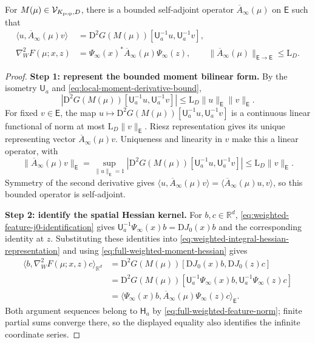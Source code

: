 \begin{lemma}
\label{lemma-structured-weighted-hessian-factorization}
For $M(\mu)\in\mathcal V_{K_{\rm pop},D}$, there is a bounded self-adjoint
operator $\overline A_\infty(\mu)$ on $\mathsf E$ such that
\begin{align}
 \langle u,\overline A_\infty(\mu)v\rangle
 &=\mathrm D^2G(M(\mu))[\mathsf U_a^{-1}u,\mathsf U_a^{-1}v],
 \label{eq:full-weighted-moment-hessian}\\
 \nabla_W^2F(\mu;x,z)
 &=\Psi_\infty(x)^*\overline A_\infty(\mu)\Psi_\infty(z),
 \qquad \|\overline A_\infty(\mu)\|_{\mathsf E\to\mathsf E}\le\mathrm L_D.
 \label{eq:full-weighted-hessian-factorization}
\end{align}
\end{lemma}
\begin{proof}
\noindent\textbf{Step 1: represent the bounded moment bilinear form.}
By the isometry $\mathsf U_a$ and \eqref{eq:local-moment-derivative-bound},
\[
 |\mathrm D^2G(M(\mu))[\mathsf U_a^{-1}u,\mathsf U_a^{-1}v]|
 \le\mathrm L_D\|u\|_{\mathsf E}\|v\|_{\mathsf E}.
\]
For fixed $v\in\mathsf E$, the map
$u\mapsto\mathrm D^2G(M(\mu))[\mathsf U_a^{-1}u,\mathsf U_a^{-1}v]$
is a continuous linear functional of norm at most
$\mathrm L_D\|v\|_{\mathsf E}$. Riesz representation gives its unique representing
vector $\overline A_\infty(\mu)v$. Uniqueness and linearity in $v$
make this a linear operator, with
\[
 \|\overline A_\infty(\mu)v\|_{\mathsf E}
 =\sup_{\|u\|_{\mathsf E}=1}
   |\mathrm D^2G(M(\mu))[\mathsf U_a^{-1}u,\mathsf U_a^{-1}v]|
 \le\mathrm L_D\|v\|_{\mathsf E}.
\]
Symmetry of the second derivative gives
$\langle u,\overline A_\infty(\mu)v\rangle
=\langle\overline A_\infty(\mu)u,v\rangle$,
so this bounded operator is self-adjoint.
\par\noindent\textbf{Step 2: identify the spatial Hessian kernel.}
For $b,c\in\mathbb R^d$, \cref{eq:weighted-feature-j0-identification}
gives $\mathsf U_a^{-1}\Psi_\infty(x)b=\mathrm D J_0(x)b$ and the
corresponding identity at $z$. Substituting these identities into
\cref{eq:weighted-integral-hessian-representation} and using
\cref{eq:full-weighted-moment-hessian} gives
\[
\begin{aligned}
 \langle b,\nabla_W^2F(\mu;x,z)c\rangle_{\mathbb R^d}
 &=\mathrm D^2G(M(\mu))[\mathrm D J_0(x)b,\mathrm D J_0(z)c]\\
 &=\mathrm D^2G(M(\mu))[
       \mathsf U_a^{-1}\Psi_\infty(x)b,\mathsf U_a^{-1}\Psi_\infty(z)c]\\
 &=\langle\Psi_\infty(x)b,
       \overline A_\infty(\mu)\Psi_\infty(z)c\rangle_{\mathsf E}.
\end{aligned}
\]
Both argument sequences belong to $\mathsf H_a$ by
\eqref{eq:full-weighted-feature-norm}; finite partial sums converge there,
so the displayed equality also identifies the infinite coordinate series.
\end{proof}

